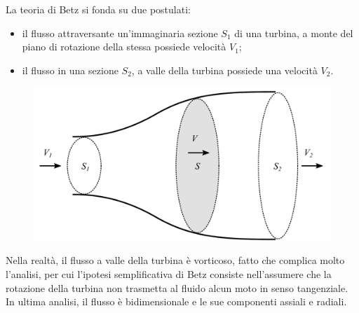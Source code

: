 La teoria di Betz si fonda su due postulati:
\begin{itemize}
\item il flusso attraversante un'immaginaria sezione $S_1$ di una turbina, a monte del piano di rotazione della stessa possiede velocità $V_1$;
\item il flusso in una sezione $S_2$, a valle della turbina possiede una velocità $V_2$.
\end{itemize}
\begin{figure}
\centering
  \includegraphics[width=.6\textwidth]{fig/Betz.pdf}
\caption{}
\label{}
\end{figure}
Nella realtà, il flusso a valle della turbina è vorticoso, fatto che complica molto l'analisi, per cui l'ipotesi semplificativa di Betz consiste nell'assumere che la rotazione della turbina non trasmetta al fluido alcun moto in senso tangenziale. In ultima analisi, il flusso è bidimensionale e le sue componenti assiali e radiali. 

